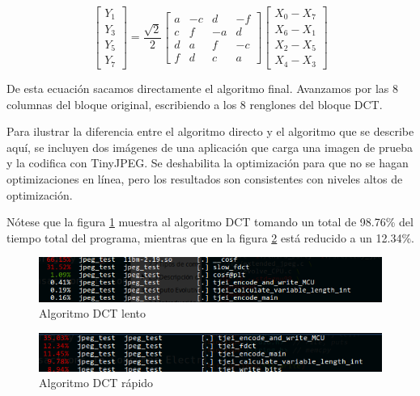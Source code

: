 {\begin{equation*}
    \begin{bmatrix}
        Y_1 \\
        Y_3 \\
        Y_5 \\
        Y_7
    \end{bmatrix}
    = \frac{\sqrt{2}}{2} \begin{bmatrix}
        a & -c & d & -f  \\
        c & f & -a & d  \\
        d & a & f & -c  \\
        f & d & c & a
        \end {bmatrix} \begin {bmatrix}
        X_0 - X_7 \\
        X_6 - X_1 \\
        X_2 - X_5 \\
        X_4 - X_3
        \end {bmatrix}
\end{equation*}

De esta ecuación sacamos directamente el algoritmo final. Avanzamos por las 8 columnas del bloque original, escribiendo a los 8 renglones del bloque DCT.

Para ilustrar la diferencia entre el algoritmo directo y el algoritmo que se describe aquí, se incluyen dos imágenes de una aplicación que carga una imagen de prueba y la codifica con TinyJPEG. Se deshabilita la optimización para que no se hagan optimizaciones en línea, pero los resultados son consistentes con niveles altos de optimización.

Nótese que la figura \ref{fig:pre_dct} muestra al algoritmo DCT tomando un total de 98.76\% del tiempo total del programa, mientras que en la figura \ref{fig:post_dct} está reducido a un 12.34\%.

\begin{figure}[h]
    \includegraphics[width=1.0\textwidth]{pre_dct}
    \caption{Algoritmo DCT lento}
    \label{fig:pre_dct}
\end{figure}

\begin{figure}[h]
    \includegraphics[width=1.0\textwidth]{post_dct}
    \caption{Algoritmo DCT rápido}
    \label{fig:post_dct}
\end{figure}


}
